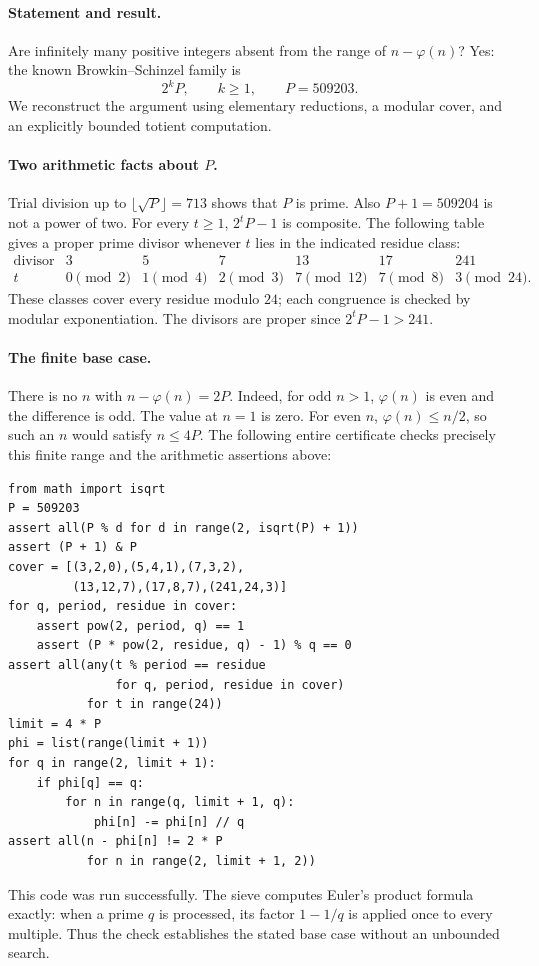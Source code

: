 \paragraph{Statement and result.}
Are infinitely many positive integers absent from the range of
\(n-\varphi(n)\)? Yes: the known Browkin--Schinzel family is
\[
 2^kP,\qquad k\geq1,\qquad P=509203.
 \tag{1}
\]
We reconstruct the argument using elementary reductions, a modular
cover, and an explicitly bounded totient computation.

\paragraph{Two arithmetic facts about \(P\).}
Trial division up to \(\lfloor\sqrt P\rfloor=713\) shows that \(P\)
is prime. Also \(P+1=509204\) is not a power of two.
For every \(t\geq1\), \(2^tP-1\) is composite. The following table gives
a proper prime divisor whenever \(t\) lies in the indicated residue class:
\[
\begin{array}{c|rrrrrr}
\text{divisor}&3&5&7&13&17&241\\ \hline
t&0\pmod2&1\pmod4&2\pmod3&7\pmod{12}&7\pmod8&3\pmod{24}.
\end{array}
\tag{2}
\]
These classes cover every residue modulo \(24\); each congruence is
checked by modular exponentiation. The divisors are proper since
\(2^tP-1>241\).

\paragraph{The finite base case.}
There is no \(n\) with \(n-\varphi(n)=2P\).
Indeed, for odd \(n>1\), \(\varphi(n)\) is even and the difference is
odd. The value at \(n=1\) is zero. For even \(n\),
\(\varphi(n)\leq n/2\), so such an \(n\) would satisfy \(n\leq4P\).
The following entire certificate checks precisely this finite range
and the arithmetic assertions above:
\begin{verbatim}
from math import isqrt
P = 509203
assert all(P % d for d in range(2, isqrt(P) + 1))
assert (P + 1) & P
cover = [(3,2,0),(5,4,1),(7,3,2),
         (13,12,7),(17,8,7),(241,24,3)]
for q, period, residue in cover:
    assert pow(2, period, q) == 1
    assert (P * pow(2, residue, q) - 1) % q == 0
assert all(any(t % period == residue
               for q, period, residue in cover)
           for t in range(24))
limit = 4 * P
phi = list(range(limit + 1))
for q in range(2, limit + 1):
    if phi[q] == q:
        for n in range(q, limit + 1, q):
            phi[n] -= phi[n] // q
assert all(n - phi[n] != 2 * P
           for n in range(2, limit + 1, 2))
\end{verbatim}
This code was run successfully. The sieve computes Euler's product
formula exactly: when a prime \(q\) is processed, its factor
\(1-1/q\) is applied once to every multiple. Thus the check establishes
the stated base case without an unbounded search.

